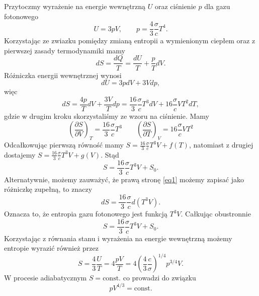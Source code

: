\documentclass[11pt,a4paper]{article}
\newcommand{\Partial}[3]{\left( \frac{\partial #1}{\partial #2} \right)_{#3}}
\begin{document}
Przytoczmy wyrażenie na energie wewnętrzną $U$ oraz ciśnienie $p$ dla gazu fotonowego
\begin{equation}
	U = 3 p V, \qquad p = \frac{4}{3} \frac{\sigma}{c} T^4.
\end{equation}
Korzystając ze zwiazku pomiędzy zmianą entropii a wymienionym ciepłem oraz z pierwszej zasady termodynamiki mamy
\begin{equation}
	dS = \frac{dQ}{T} = \frac{dU}{T} + \frac{p}{T} dV.
\end{equation}
Różniczka energii wewnętrznej wynosi 
\begin{equation}
	dU = 3p dV + 3 V dp,
\end{equation}
więc
\begin{equation}
\label{eq1}
	dS = \frac{4p }{T} dV + \frac{3 V}{T} dp = \frac{16}{3} \frac{\sigma}{c} T^3 dV + 16 \frac{\sigma }{c} V T^2 dT,
\end{equation}
gdzie w drugim kroku skorzystaliśmy ze wzoru na ciśnienie.
Mamy
\begin{equation}
    \Partial{S}{V}{T}=\frac{16}{3} \frac{\sigma}{c}T^3 \qquad \Partial{S}{T}{V}=16 \frac{\sigma}{c}V T^2
\end{equation}
Odcałkowując pierwszą równość mamy $S = \frac{16}{3} \frac{\sigma}{c} T^3 V +f(T)$, natomiast z drugiej dostajemy $S = \frac{16}{3} \frac{\sigma}{c} T^3 V +g(V)$. Stąd 
\begin{equation}
	S = \frac{16}{3} \frac{\sigma }{c} T^3 V + S_0.
\end{equation}
Alternatywnie, możemy zauważyć, że prawą stronę \eqref{eq1} możemy zapisać jako różniczkę zupełną, to znaczy
\begin{equation}
	dS = \frac{16}{3} \frac{\sigma }{c}   d \left(T^3 V\right).
\end{equation}
Oznacza to, że entropia gazu fotonowego jest funkcją $T^3 V$. Całkując obustronnie
\begin{equation}
	S = \frac{16}{3} \frac{\sigma }{c} T^3 V + S_0.
\end{equation}
Korzystając z równania stanu i wyrażenia na energie wewnętrzną możemy entropie wyrazić również przez
\begin{equation}
	S = \frac{4}{3} \frac{U}{T} = 4 \frac{p V}{T}=4\left( \frac{4}{3} \frac{c}{\sigma} \right)^{1/4}p^{3/4}V.
\end{equation}
W procesie adiabatycznym $S=\text{const.}$ co prowadzi do związku
\begin{equation}
    pV^{4/3}=\text{const.}
\end{equation}
\end{document}
